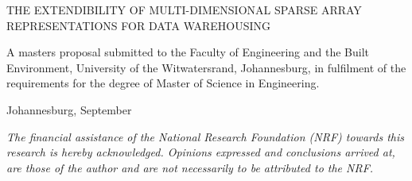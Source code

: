 \documentclass[MScDiss,altheaders,colorlinks,a4paper]{wits-eie-thesis}
\begin{document}
	
\begin{titlepage}
	\setcounter{page}{0}  %
	\vspace*{50pt}
	{\Large \bfseries \raggedright THE EXTENDIBILITY OF MULTI-DIMENSIONAL SPARSE ARRAY REPRESENTATIONS FOR DATA WAREHOUSING\par} 
	\vspace*{40pt}
	\vspace*{\fill}{\large \scshape \centering \eeThDraft \par}
	\vspace{\fill}
	\ifx\@putlogo\@putlogotrue
	{
		\begin{center}\end{center}
	}
	\fi
	\vspace{\fill}
	{
		A %
		masters proposal submitted to the Faculty of Engineering and the Built Environment, University of the Witwatersrand, Johannesburg, in fulfilment of the requirements for the degree of Master of Science in Engineering.\par
		\vspace*{2em}
		Johannesburg, September
		
		\vspace*{1em}
		\normalsize
		\textit {The financial assistance of the National Research Foundation (NRF) towards this research is hereby acknowledged. Opinions expressed and conclusions arrived at, are those of the author and are not necessarily to be attributed to the NRF.}
	}
\end{titlepage}
	
\end{document}
